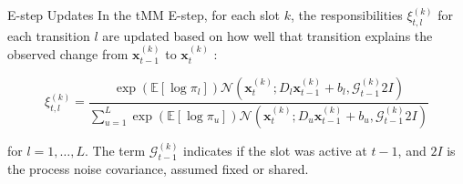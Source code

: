 \documentclass[10pt]{article}
\begin{document}
E-step Updates In the tMM E-step, for each slot $k$, the responsibilities $\xi_{t, l}^{(k)}$ for each transition $l$ are updated based on how well that transition explains the observed change from $\mathbf{x}_{t-1}^{(k)}$ to $\mathbf{x}_{t}^{(k)}$ :

$$
\xi_{t, l}^{(k)}=\frac{\exp \left(\mathbb{E}\left[\log \pi_{l}\right]\right) \mathcal{N}\left(\mathbf{x}_{t}^{(k)} ; D_{l} \mathbf{x}_{t-1}^{(k)}+b_{l}, \mathcal{G}_{t-1}^{(k)} 2 I\right)}{\sum_{u=1}^{L} \exp \left(\mathbb{E}\left[\log \pi_{u}\right]\right) \mathcal{N}\left(\mathbf{x}_{t}^{(k)} ; D_{u} \mathbf{x}_{t-1}^{(k)}+b_{u}, \mathcal{G}_{t-1}^{(k)} 2 I\right)}
$$

for $l=1, \ldots, L$. The term $\mathcal{G}_{t-1}^{(k)}$ indicates if the slot was active at $t-1$, and $2 I$ is the process noise covariance, assumed fixed or shared.
\end{document}
